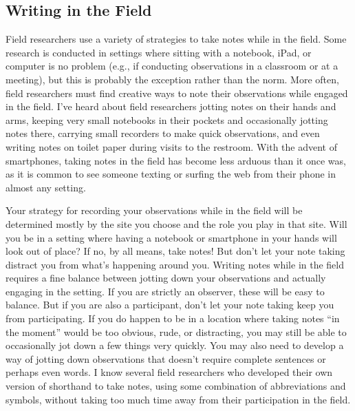 \subsection{Writing in the Field}

Field researchers use a variety of strategies to take notes while in the field. Some research is conducted in settings where sitting with a notebook, iPad, or computer is no problem (e.g., if conducting observations in a classroom or at a meeting), but this is probably the exception rather than the norm. More often, field researchers must find creative ways to note their observations while engaged in the field. I’ve heard about field researchers jotting notes on their hands and arms, keeping very small notebooks in their pockets and occasionally jotting notes there, carrying small recorders to make quick observations, and even writing notes on toilet paper during visits to the restroom. With the advent of smartphones, taking notes in the field has become less arduous than it once was, as it is common to see someone texting or surfing the web from their phone in almost any setting.

Your strategy for recording your observations while in the field will be determined mostly by the site you choose and the role you play in that site. Will you be in a setting where having a notebook or smartphone in your hands will look out of place? If no, by all means, take notes! But don’t let your note taking distract you from what’s happening around you. Writing notes while in the field requires a fine balance between jotting down your observations and actually engaging in the setting. If you are strictly an observer, these will be easy to balance. But if you are also a participant, don’t let your note taking keep you from participating. If you do happen to be in a location where taking notes “in the moment” would be too obvious, rude, or distracting, you may still be able to occasionally jot down a few things very quickly. You may also need to develop a way of jotting down observations that doesn’t require complete sentences or perhaps even words. I know several field researchers who developed their own version of shorthand to take notes, using some combination of abbreviations and symbols, without taking too much time away from their participation in the field.

